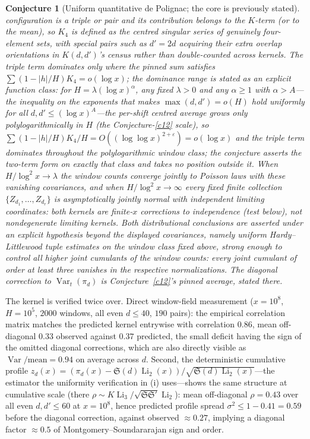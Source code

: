 \documentclass[11pt]{article}
\newtheorem{conjecture}{Conjecture}
\theoremstyle{definition}
\newcommand{\Li}{\operatorname{Li}}
\newcommand{\SG}{\mathfrak S}
\begin{document}
\begin{conjecture}[Uniform quantitative de Polignac; the core is
previously stated]
configuration is a triple or pair and its contribution belongs to
the $K$-term (or to the mean), so $K_4$ is defined as the centred
singular series of \emph{genuinely four-element} sets, with special
pairs such as $d'=2d$ acquiring their extra overlap orientations in
$K(d,d')$'s census rather than double-counted across kernels.  The
triple term dominates only
where the pinned sum satisfies $\sum(1-|h|/H)K_4=o(\log x)$; the
dominance range is stated as an explicit function class: for
$H=\lambda(\log x)^{\alpha}$, any
fixed $\lambda>0$ and any $\alpha\ge1$ with $\alpha>A$---the
inequality on the exponents that makes $\max(d,d')=o(H)$ hold
uniformly for all $d,d'\le(\log x)^{A}$---the per-shift centred average
grows only polylogarithmically in $H$ (the Conjecture-\ref{c12}
scale), so $\sum(1-|h|/H)K_4/H=O((\log\log x)^{2+\varepsilon})
=o(\log x)$ and the triple term dominates throughout the
polylogarithmic window class; the conjecture asserts the two-term
form on exactly that class and takes no position outside it.  When
$H/\log^2x\to\lambda$ the
window counts converge jointly to Poisson laws with these vanishing
covariances, and when $H/\log^2x\to\infty$ every fixed finite
collection $\{Z_{d_1},\dots,Z_{d_r}\}$ is asymptotically jointly
normal with \emph{independent} limiting coordinates: both kernels
are finite-$x$ corrections to independence (test below), not
nondegenerate limiting kernels.  Both distributional conclusions are
asserted under an explicit hypothesis beyond the displayed
covariances, namely uniform Hardy--Littlewood tuple estimates on the
window class fixed above, strong enough to control all higher joint
cumulants of the window counts: every joint cumulant of order at
least three vanishes in the respective normalizations.  The diagonal
correction to
$\operatorname{Var}_t(\pi_d)$ is Conjecture~\ref{c12}'s pinned
average, stated there.
\end{conjecture}

The kernel is verified twice over.  Direct window-field measurement
($x=10^8$, $H=10^5$, $2000$ windows, all even $d\le40$, $190$
pairs): the empirical correlation matrix matches the predicted kernel
entrywise with correlation $0.86$, mean off-diagonal $0.33$ observed
against $0.37$ predicted, the small deficit having the sign of the
omitted diagonal corrections, which are also directly visible as
$\operatorname{Var}/\text{mean}=0.94$ on average across $d$.
Second, the deterministic cumulative profile
$z_d(x)=(\pi_d(x)-\SG(d)\Li_2(x))/\sqrt{\SG(d)\Li_2(x)}$---the
estimator the uniformity verification in (i) uses---shows the same
structure at cumulative scale (there
$\rho\sim K\Li_3/\sqrt{\SG\SG'}\Li_2$): mean off-diagonal $\rho=0.43$
over all even $d,d'\le60$ at $x=10^8$, hence predicted profile spread
$\sigma^2\le1-0.41=0.59$ before the diagonal correction, against
observed ${\approx}0.27$, implying a diagonal factor ${\approx}0.5$
of Montgomery--Soundararajan sign and order.
\end{document}

